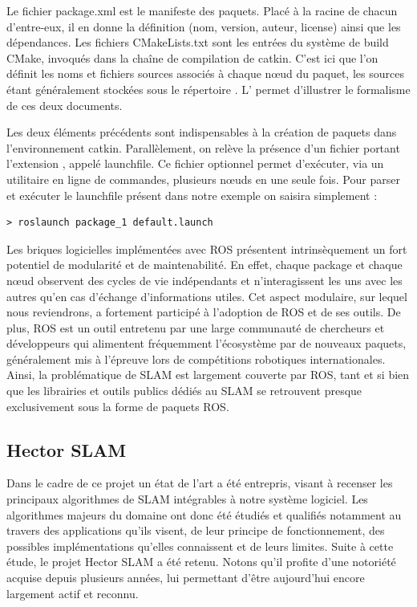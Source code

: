 Le fichier package.xml\cite{Bib_ROS_package} est le manifeste des paquets. Placé à la racine de chacun d'entre-eux, il en donne la définition (nom, version, auteur, license) ainsi que les dépendances. 
Les fichiers CMakeLists.txt\cite{Bib_ROS_manifeste} sont les entrées du système de build CMake, invoqués dans la chaîne de compilation de catkin. 
C'est ici que l'on définit les noms et fichiers sources associés à chaque n\oe{}ud du paquet, les sources étant généralement stockées sous le répertoire . 
L' permet d'illustrer le formalisme de ces deux documents. 

Les deux éléments précédents sont indispensables à la création de paquets dans l'environnement catkin. 
Parallèlement, on relève la présence d'un fichier portant l'extension , appelé launchfile.  
Ce fichier optionnel permet d'exécuter, via un utilitaire en ligne de commandes, plusieurs n\oe{}uds en une seule fois. 
Pour parser et exécuter le launchfile présent dans notre exemple on saisira simplement :
\\
\begin{lstlisting}[style=customcpp]
> roslaunch package_1 default.launch
\end{lstlisting}


Les briques logicielles implémentées avec \gls{ROS} présentent intrinsèquement un fort potentiel de modularité et de maintenabilité. 
En effet, chaque package et chaque n\oe{}ud observent des cycles de vie indépendants et n'interagissent les uns avec les autres qu'en cas d'échange d'informations utiles. 
Cet aspect modulaire, sur lequel nous reviendrons, a fortement participé à l'adoption de \gls{ROS} et de ses outils. 
De plus, \gls{ROS} est un outil entretenu par une large communauté de chercheurs et développeurs qui alimentent fréquemment l'écosystème par de nouveaux paquets, généralement mis à l'épreuve lors de compétitions robotiques internationales. 
Ainsi, la problématique de \gls{SLAM} est largement couverte par \gls{ROS}, tant et si bien que les librairies et outils publics dédiés au \gls{SLAM} se retrouvent presque exclusivement sous la forme de paquets \gls{ROS}.

  \subsection{Hector SLAM}
  \label{subsection:hector}
  
Dans le cadre de ce projet un état de l'art a été entrepris, visant à recenser les principaux algorithmes de \gls{SLAM} intégrables à notre système logiciel.
Les algorithmes majeurs du domaine ont donc été étudiés et qualifiés notamment au travers des applications qu'ils visent, de leur principe de fonctionnement, des possibles implémentations qu'elles connaissent et de leurs limites. 
Suite à cette étude, le projet \gls{Hector SLAM} a été retenu. 
Notons qu'il profite d'une notoriété acquise depuis plusieurs années, lui permettant d'être aujourd'hui encore largement actif et reconnu\cite{Bib_Hector_2016}\cite{Bib_Team_Hector}. 

